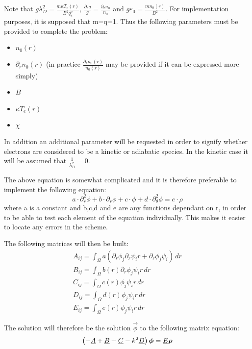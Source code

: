 Note that $g\lambda_D^2=\frac{m\kappa T_e(r)}{B^2q_e^2}$, $\frac{\partial_rg}{g}=\frac{\partial_rn_0}{n_0}$ and $g\varepsilon_0=\frac{mn_0(r)}{B^2}$. For implementation purposes, it is supposed that m=q=1. Thus the following parameters must be provided to complete the problem:
\begin{itemize}
 \item $n_0(r)$
 \item $\partial_rn_0(r)$ (in practice $\frac{\partial_rn_0(r)}{n_0(r)}$ may be provided if it can be expressed more simply)
 \item $B$
 \item $\kappa T_e(r)$
 \item $\chi$
\end{itemize}

In addition an additional parameter will be requested in order to signify whether electrons are considered to be a kinetic or adiabatic species. In the kinetic case it will be assumed that $\frac{1}{\lambda_D^2}=0$.

The above equation is somewhat complicated and it is therefore preferable to implement the following equation:
\begin{equation}
 a\cdot\partial_r^2\phi+b\cdot\partial_r\phi+c\cdot\phi+d\cdot\partial_\theta^2\phi=e\cdot\rho
\end{equation}
where a is a constant and b,c,d and e are any functions dependant on r, in order to be able to test each element of the equation individually. This makes it easier to locate any errors in the scheme.

The following matrices will then be built:
\begin{gather}
 A_{ij}=\int_\Omega a\left(\partial_r\phi_j\partial_r\psi_i r + \partial_r\phi_j\psi_i\right)\, dr\\
 B_{ij}=\int_\Omega b(r)\partial_r\phi_j\psi_i r\, dr\\
 C_{ij}=\int_\Omega c(r)\phi_j\psi_i r\, dr\\
 D_{ij}=\int_\Omega d(r)\phi_j\psi_i r\, dr\\
 E_{ij}=\int_\Omega e(r)\phi_j\psi_i r\, dr
\end{gather}

The solution will therefore be the solution $\vec{\phi}$ to the following matrix equation:
\begin{equation}
 \left(-\underline{A}+\underline{B}+\underline{C}-k^2\underline{D}\right)\boldsymbol{\phi}=\underline{E}\boldsymbol{\rho}
\end{equation}

